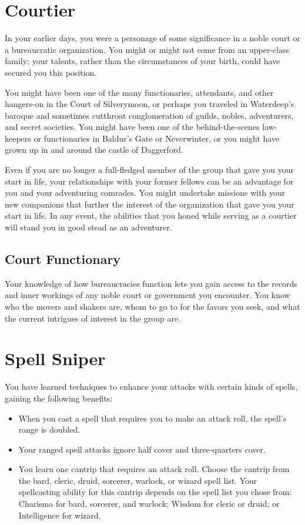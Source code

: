 {\section*{Courtier}
In your earlier days, you were a personage of some significance in a noble court or a bureaucratic organization. You might or might not come from an upper-class family; your talents, rather than the circumstances of your birth, could have secured you this position.

You might have been one of the many functionaries, attendants, and other hangers-on in the Court of Silverymoon, or perhaps you traveled in Waterdeep's baroque and sometimes cutthroat conglomeration of guilds, nobles, adventurers, and secret societies. You might have been one of the behind-the-scenes law-keepers or functionaries in Baldur's Gate or Neverwinter, or you might have grown up in and around the castle of Daggerford.

Even if you are no longer a full-fledged member of the group that gave you your start in life, your relationships with your former fellows can be an advantage for you and your adventuring comrades. You might undertake missions with your new companions that further the interest of the organization that gave you your start in life. In any event, the abilities that you honed while serving as a courtier will stand you in good stead as an adventurer.
\subsection*{Court Functionary}
Your knowledge of how bureaucracies function lets you gain access to the records and inner workings of any noble court or government you encounter. You know who the movers and shakers are, whom to go to for the favors you seek, and what the current intrigues of interest in the group are.

\section*{Spell Sniper}
You have learned techniques to enhance your attacks with certain kinds of spells, gaining the following benefits:
\begin{itemize}
	\item When you cast a spell that requires you to make an attack roll, the spell's range is doubled.
	\item Your ranged spell attacks ignore half cover and three-quarters cover.
	\item You learn one cantrip that requires an attack roll. Choose the cantrip from the bard, cleric, druid, sorcerer, warlock, or wizard spell list. Your spellcasting ability for this cantrip depends on the spell list you chose from: Charisma for bard, sorcerer, and warlock; Wisdom for cleric or druid; or Intelligence for wizard.
\end{itemize}

}
